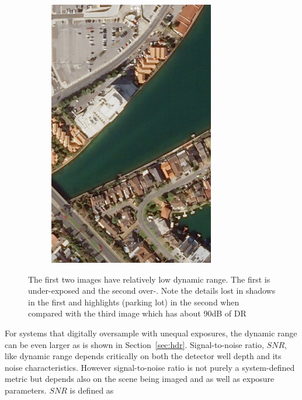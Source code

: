 \documentclass[10pt,journal]{IEEEtran}  %
\begin{document}
\begin{figure}[h!]
\begin{subfigure}{0.31\linewidth}
\includegraphics[width = \textwidth]{figures/pb_good_dr.png}
\end{subfigure}
\caption{The first two images have relatively low dynamic range.  The first is under-exposed and the second over-.  Note the details lost in shadows in the first and highlights (parking lot) in the second when compared with the third image which has about 90dB of DR}
\end{figure}

For systems that digitally oversample with unequal exposures, the dynamic range can be even larger as is shown in Section~\ref{sec:hdr}.
Signal-to-noise ratio, $SNR$, like dynamic range depends critically on both the detector well depth and its noise characteristics.  However signal-to-noise ratio is not purely a system-defined metric but depends also on the scene being imaged and as well as exposure parameters.  $SNR$ is defined as
\end{document}

